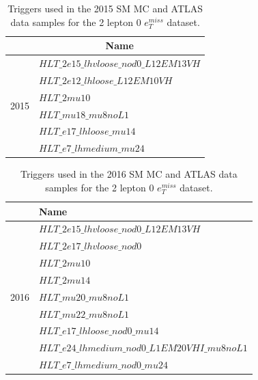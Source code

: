 \begin{table}[h!]
    \centering
    
    \begin{tabular}{|l|l|}
    \hline
                          & \multicolumn{1}{c|}{Name}              \\ \hline
    \multirow{6}{*}{2015} & $HLT\_2e15\_lhvloose\_nod0\_L12EM13VH$ \\ \cline{2-2} 
                          & $HLT\_2e12\_lhloose\_L12EM10VH$          \\ \cline{2-2} 
                          & $HLT\_2mu10$                           \\ \cline{2-2} 
                          & $HLT\_mu18\_mu8noL1$                   \\ \cline{2-2} 
                          & $HLT\_e17\_lhloose\_mu14$              \\ \cline{2-2} 
                          & $HLT\_e7\_lhmedium\_mu24$              \\ \hline
    \end{tabular}
    \caption[2015 triggers table]{Triggers used in the 2015 SM MC and ATLAS data samples for the 2 lepton 0 $e_T^{miss}$ dataset.}
    \label{tab:triggers2015}
    \end{table}



\begin{table}[h!]
    \centering
    
    \begin{tabular}{|l|l|}
    \hline
                          & Name  \\ \hline
    \multirow{9}{*}{2016} & $HLT\_2e15\_lhvloose\_nod0\_L12EM13VH$                 \\ \cline{2-2} 
                          & $HLT\_2e17\_lhvloose\_nod0$                   \\ \cline{2-2} 
                          & $HLT\_2mu10$                  \\ \cline{2-2} 
                          & $HLT\_2mu14$                  \\ \cline{2-2} 
                          & $HLT\_mu20\_mu8noL1$                  \\ \cline{2-2} 
                          & $HLT\_mu22\_mu8noL1$                 \\ \cline{2-2} 
                          & $HLT\_e17\_lhloose\_nod0\_mu14$                   \\ \cline{2-2} 
                          & $HLT\_e24\_lhmedium\_nod0\_L1EM20VHI\_mu8noL1$                  \\ \cline{2-2} 
                          & $HLT\_e7\_lhmedium\_nod0\_mu24$                   \\ \hline
    \end{tabular}
    \caption[2016 triggers table]{Triggers used in the 2016 SM MC and ATLAS data samples for the 2 lepton 0 $e_T^{miss}$ dataset.}
    \label{tab:triggers2016}
    \end{table}




